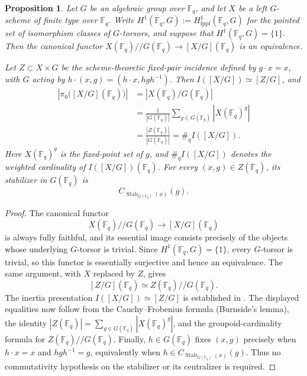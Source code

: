 \documentclass[a4paper,12pt]{amsart}
\newtheorem{prop}[thm]{Proposition}
\theoremstyle{definition}
\newcommand{\Fb}{\mathbb{F}}
\begin{document}
\begin{prop}
\label{prop:rational-points-of-quotients}
Let $G$ be an algebraic group over $\Fb_q$, and let $X$ be a left $G$-scheme of finite type over $\Fb_q$.  Write $H^1(\Fb_q,G):=H^1_{\mathrm{fppf}}(\Fb_q,G)$ for the pointed set of isomorphism classes of $G$-torsors, and suppose that $H^1(\Fb_q,G)=\{1\}$.  Then the canonical functor $X(\Fb_q)\mathbin{//}G(\Fb_q)\to[X/G](\Fb_q)$ is an equivalence.

Let $Z\subset X\times G$ be the scheme-theoretic fixed-pair incidence defined by $g\cdot x=x$, with $G$ acting by $h\cdot(x,g)=(h\cdot x,hgh^{-1})$.  Then $I([X/G])\simeq[Z/G]$, and
\[
\begin{aligned}
\left|\pi_0\bigl([X/G](\Fb_q)\bigr)\right|
&=
\left|X(\Fb_q)/G(\Fb_q)\right|\\
&=
\frac{1}{|G(\Fb_q)|}
\sum_{g\in G(\Fb_q)}|X(\Fb_q)^g|\\
&=
\frac{|Z(\Fb_q)|}{|G(\Fb_q)|}
=
\#_q I([X/G]).
\end{aligned}
\]
Here $X(\Fb_q)^g$ is the fixed-point set of $g$, and $\#_q I([X/G])$ denotes the weighted cardinality of $I([X/G])(\Fb_q)$.  For every $(x,g)\in Z(\Fb_q)$, its stabilizer in $G(\Fb_q)$ is
\[
C_{\operatorname{Stab}_{G(\Fb_q)}(x)}(g).
\]
\end{prop}

\begin{proof}
The canonical functor
\[
X(\Fb_q)\mathbin{//}G(\Fb_q)\longrightarrow[X/G](\Fb_q)
\]
is always fully faithful, and its essential image consists precisely of the objects whose underlying $G$-torsor is trivial.  Since $H^1(\Fb_q,G)=\{1\}$, every $G$-torsor is trivial, so this functor is essentially surjective and hence an equivalence.  The same argument, with $X$ replaced by $Z$, gives
\[
[Z/G](\Fb_q)\simeq Z(\Fb_q)\mathbin{//}G(\Fb_q).
\]
The inertia presentation $I([X/G])\simeq[Z/G]$ is established in \cite[Corollary~2.5]{HP2}.  The displayed equalities now follow from the Cauchy--Frobenius formula (Burnside's lemma), the identity $|Z(\Fb_q)|=\sum_{g\in G(\Fb_q)}|X(\Fb_q)^g|$, and the groupoid-cardinality formula for $Z(\Fb_q)\mathbin{//}G(\Fb_q)$.  Finally, $h\in G(\Fb_q)$ fixes $(x,g)$ precisely when $h\cdot x=x$ and $hgh^{-1}=g$, equivalently when $h\in C_{\operatorname{Stab}_{G(\Fb_q)}(x)}(g)$.  Thus no commutativity hypothesis on the stabilizer or its centralizer is required. 
\end{proof}
\end{document}
